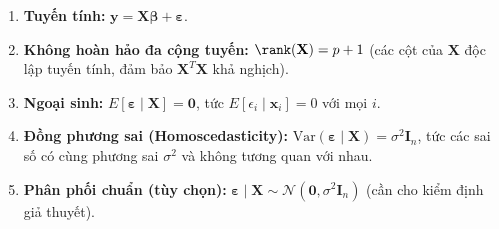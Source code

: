 \begin{enumerate}[label=\textbf{GM\arabic*.}]
    \item \textbf{Tuyến tính:} $\mathbf{y} = \mathbf{X}\boldsymbol{\beta} +
          \boldsymbol{\varepsilon}$.
    \item \textbf{Không hoàn hảo đa cộng tuyến:} $\rank(\mathbf{X}) = p+1$
          (các cột của $\mathbf{X}$ độc lập tuyến tính, đảm bảo
          $\mathbf{X}^T\mathbf{X}$ khả nghịch).
    \item \textbf{Ngoại sinh:} $E[\boldsymbol{\varepsilon} \mid \mathbf{X}] =
          \mathbf{0}$, tức $E[\epsilon_i \mid \mathbf{x}_i] = 0$ với mọi $i$.
    \item \textbf{Đồng phương sai (Homoscedasticity):}
          $\mathrm{Var}(\boldsymbol{\varepsilon} \mid \mathbf{X}) =
          \sigma^2 \mathbf{I}_n$, tức các sai số có cùng phương sai $\sigma^2$
          và không tương quan với nhau.
    \item \textbf{Phân phối chuẩn (tùy chọn):}
          $\boldsymbol{\varepsilon} \mid \mathbf{X} \sim
          \mathcal{N}(\mathbf{0}, \sigma^2 \mathbf{I}_n)$
          (cần cho kiểm định giả thuyết).
\end{enumerate}


